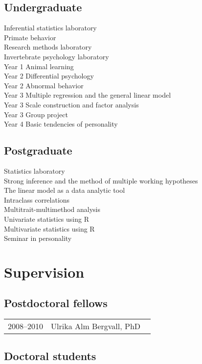 \documentclass[11pt]{article}
\begin{document}
\subsection*{Undergraduate}
Inferential statistics laboratory \\
Primate behavior \\
Research methods laboratory \\
Invertebrate psychology laboratory \\
Year 1 Animal learning \\
Year 2 Differential psychology \\
Year 2 Abnormal behavior \\
Year 3 Multiple regression and the general linear model \\
Year 3 Scale construction and factor analysis \\
Year 3 Group project \\
Year 4 Basic tendencies of personality

\subsection*{Postgraduate}
Statistics laboratory \\
Strong inference and the method of multiple working hypotheses \\
The linear model as a data analytic tool \\
Intraclass correlations \\
Multitrait-multimethod analysis \\
Univariate statistics using R \\
Multivariate statistics using R \\
Seminar in personality

\section*{Supervision}
\subsection*{Postdoctoral fellows}

\begin{tabular}{p{3cm}p{12cm}}
2008--2010 & Ulrika Alm Bergvall, PhD \
\end{tabular}

\subsection*{Doctoral students}
\end{document}
